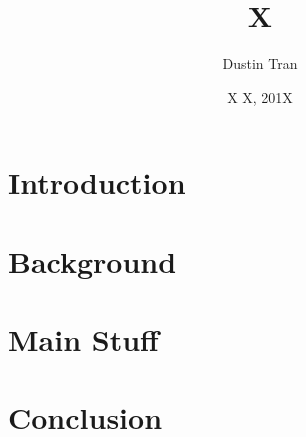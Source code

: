 \documentclass{amsart}
\begin{document}
\title{X}
\author[Tran]{Dustin Tran}
\date{X X, 201X}

\begin{abstract}

\end{abstract}
\maketitle

\section{Introduction}%

\section{Background} %

\section{Main Stuff} %

\section{Conclusion} %

\begin{thebibliography}{1}%

%

\end{thebibliography}%

\end{document}
